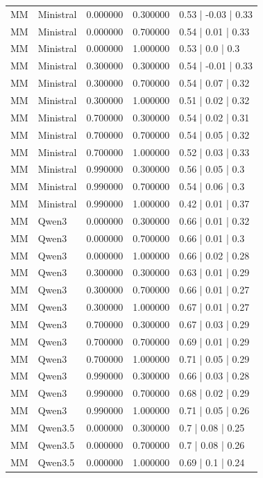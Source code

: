 \begin{longtable}{lllll}
MM & Ministral & 0.000000 & 0.300000 & 0.53 | -0.03 | 0.33 \\
MM & Ministral & 0.000000 & 0.700000 & 0.54 | 0.01 | 0.33 \\
MM & Ministral & 0.000000 & 1.000000 & 0.53 | 0.0 | 0.3 \\
MM & Ministral & 0.300000 & 0.300000 & 0.54 | -0.01 | 0.33 \\
MM & Ministral & 0.300000 & 0.700000 & 0.54 | 0.07 | 0.32 \\
MM & Ministral & 0.300000 & 1.000000 & 0.51 | 0.02 | 0.32 \\
MM & Ministral & 0.700000 & 0.300000 & 0.54 | 0.02 | 0.31 \\
MM & Ministral & 0.700000 & 0.700000 & 0.54 | 0.05 | 0.32 \\
MM & Ministral & 0.700000 & 1.000000 & 0.52 | 0.03 | 0.33 \\
MM & Ministral & 0.990000 & 0.300000 & 0.56 | 0.05 | 0.3 \\
MM & Ministral & 0.990000 & 0.700000 & 0.54 | 0.06 | 0.3 \\
MM & Ministral & 0.990000 & 1.000000 & 0.42 | 0.01 | 0.37 \\
MM & Qwen3 & 0.000000 & 0.300000 & 0.66 | 0.01 | 0.32 \\
MM & Qwen3 & 0.000000 & 0.700000 & 0.66 | 0.01 | 0.3 \\
MM & Qwen3 & 0.000000 & 1.000000 & 0.66 | 0.02 | 0.28 \\
MM & Qwen3 & 0.300000 & 0.300000 & 0.63 | 0.01 | 0.29 \\
MM & Qwen3 & 0.300000 & 0.700000 & 0.66 | 0.01 | 0.27 \\
MM & Qwen3 & 0.300000 & 1.000000 & 0.67 | 0.01 | 0.27 \\
MM & Qwen3 & 0.700000 & 0.300000 & 0.67 | 0.03 | 0.29 \\
MM & Qwen3 & 0.700000 & 0.700000 & 0.69 | 0.01 | 0.29 \\
MM & Qwen3 & 0.700000 & 1.000000 & 0.71 | 0.05 | 0.29 \\
MM & Qwen3 & 0.990000 & 0.300000 & 0.66 | 0.03 | 0.28 \\
MM & Qwen3 & 0.990000 & 0.700000 & 0.68 | 0.02 | 0.29 \\
MM & Qwen3 & 0.990000 & 1.000000 & 0.71 | 0.05 | 0.26 \\
MM & Qwen3.5 & 0.000000 & 0.300000 & 0.7 | 0.08 | 0.25 \\
MM & Qwen3.5 & 0.000000 & 0.700000 & 0.7 | 0.08 | 0.26 \\
MM & Qwen3.5 & 0.000000 & 1.000000 & 0.69 | 0.1 | 0.24 \\

\end{longtable}
